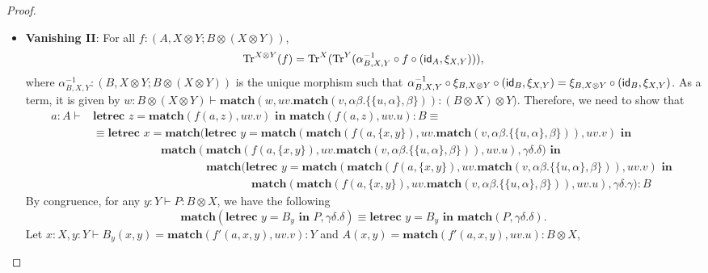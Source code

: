\begin{example}
\begin{proof}
\begin{itemize}
\begin{align*}
  a : A \vdash &\textbf{letrec } x = \textbf{match}(\{f(a), x\}, uv.v) \textbf{ in } \textbf{match}(\{f(a), x\}, uv.u) : B\\
  &\text{by $\beta$}\\
  &\textbf{letrec } x = x \textbf{ in } f(a) : B\\
  &\text{by \autoref{eq:let_equations:gc}}\\
  &\equiv f(a): B
\end{align*}
\item \textbf{Vanishing II}: For all $f : (A, X \otimes Y; B \otimes (X \otimes Y))$,
\[
\text{Tr}^{X \otimes Y}(f) = \text{Tr}^{X}(\text{Tr}^{Y}(\alpha_{B,X,Y}^{-1} \circ f \circ (\textsf{id}_{A}, \xi_{X,Y}))),
\]
where $\alpha_{B,X,Y}^{-1} : (B, X \otimes Y; B \otimes (X \otimes Y))$ is the unique morphism such that $\alpha_{B,X,Y}^{-1} \circ \xi_{B, X \otimes Y} \circ (\textsf{id}_{B}, \xi_{X,Y}) = \xi_{B, X \otimes Y} \circ (\textsf{id}_{B}, \xi_{X,Y})$.
As a term, it is given by $w : B \otimes (X \otimes Y) \vdash \textbf{match}(w, uv. \textbf{match}(v, \alpha\beta.\{\{u, \alpha\},\beta\})) : (B \otimes X) \otimes Y)$.
Therefore, we need to show that
\begin{align*}
a : A \vdash &\textbf{letrec } z = \textbf{match}(f(a,z), uv.v) \textbf{ in } \textbf{match}(f(a,z), uv.u) : B \equiv\\
&\equiv \textbf{letrec } x = \textbf{match}(\textbf{letrec } y = \textbf{match}(\textbf{match}(f(a,\{x,y\}), uv.\textbf{match}(v, \alpha\beta.\{\{u,\alpha\}, \beta\})), uv.v) \textbf{ in }\\
&\hspace{6em}\textbf{match}(\textbf{match}(f(a,\{x,y\}), uv.\textbf{match}(v, \alpha\beta.\{\{u,\alpha\}, \beta\})), uv.u), \gamma\delta.\delta) \textbf{ in }\\
&\hspace{10em}\textbf{match}(\textbf{letrec } y = \textbf{match}(\textbf{match}(f(a,\{x,y\}), uv.\textbf{match}(v, \alpha\beta.\{\{u,\alpha\}, \beta\})), uv.v) \textbf{ in }\\
&\hspace{14em}\textbf{match}(\textbf{match}(f(a,\{x,y\}), uv.\textbf{match}(v, \alpha\beta.\{\{u,\alpha\}, \beta\})), uv.u), \gamma\delta.\gamma) : B
\end{align*}
By congruence, for any $y : Y \vdash P : B \otimes X$, we have the following
\[
\textbf{match}(\textbf{letrec } y = B_{y} \textbf{ in } P, \gamma\delta.\delta) \equiv \textbf{letrec } y = B_{y} \textbf{ in } \textbf{match}(P, \gamma\delta.\delta).
\]
Let $x : X, y : Y \vdash B_y(x,y) = \textbf{match}(f'(a,x,y), uv.v) : Y$ and $A(x,y) = \textbf{match}(f'(a,x,y), uv.u) : B \otimes X$,

\end{itemize}
\end{proof}
\end{example}
